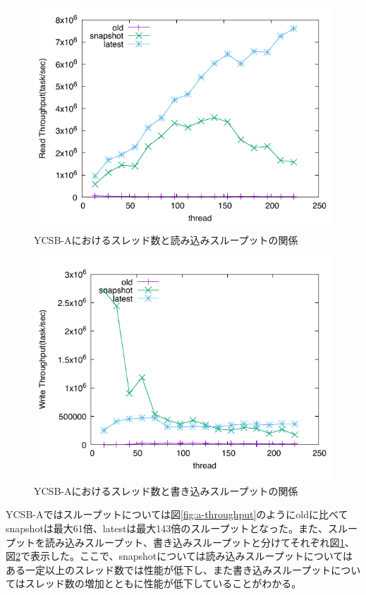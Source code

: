 \documentclass[a4paper]{jreport}	%
\begin{document}
\begin{figure}[h] 
\centering
\includegraphics[width=15cm]{ycsb-a/opposite-read-throughput}
\caption{YCSB-Aにおけるスレッド数と読み込みスループットの関係}
\label{fig:a-throughput-read}
\end{figure}


\begin{figure}[h] 
\centering
\includegraphics[width=15cm]{ycsb-a/opposite-write-throughput}
\caption{YCSB-Aにおけるスレッド数と書き込みスループットの関係}
\label{fig:a-throughput-write}
\end{figure}


YCSB-Aではスループットについては図\ref{fig:a-throughput}のようにoldに比べてsnapshotは最大61倍、latestは最大143倍のスループットとなった。また、スループットを読み込みスループット、書き込みスループットと分けてそれぞれ図\ref{fig:a-throughput-read}、図\ref{fig:a-throughput-write}で表示した。ここで、snapshotについては読み込みスループットについてはある一定以上のスレッド数では性能が低下し、また書き込みスループットについてはスレッド数の増加とともに性能が低下していることがわかる。
\end{document}
